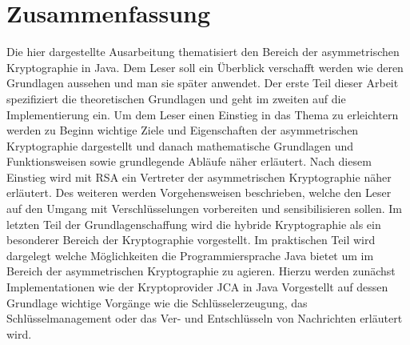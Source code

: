 \documentclass[paper=a4,11pt,german]{scrartcl} %
\begin{document}
\section{Zusammenfassung}
Die hier dargestellte Ausarbeitung thematisiert den Bereich der asymmetrischen Kryptographie in Java. Dem Leser soll ein Überblick verschafft werden wie deren Grundlagen aussehen und man sie später anwendet. Der erste Teil dieser Arbeit spezifiziert die theoretischen Grundlagen und geht im zweiten auf die Implementierung ein. Um dem Leser einen Einstieg in das Thema zu erleichtern werden zu Beginn wichtige Ziele und Eigenschaften der asymmetrischen Kryptographie dargestellt und danach mathematische Grundlagen und Funktionsweisen sowie grundlegende Abläufe näher erläutert. Nach diesem Einstieg wird mit RSA ein Vertreter der asymmetrischen Kryptographie näher erläutert. Des weiteren werden Vorgehensweisen beschrieben, welche den Leser auf den Umgang mit Verschlüsselungen vorbereiten und sensibilisieren sollen. Im letzten Teil der Grundlagenschaffung wird die hybride Kryptographie als ein besonderer Bereich der Kryptographie vorgestellt. Im praktischen Teil wird dargelegt welche Möglichkeiten die Programmiersprache Java bietet um im Bereich der asymmetrischen Kryptographie zu agieren. Hierzu werden zunächst Implementationen wie der Kryptoprovider JCA in Java Vorgestellt auf dessen Grundlage wichtige Vorgänge wie die Schlüsselerzeugung, das Schlüsselmanagement oder das Ver- und Entschlüsseln von Nachrichten erläutert wird. 



\end{document}
